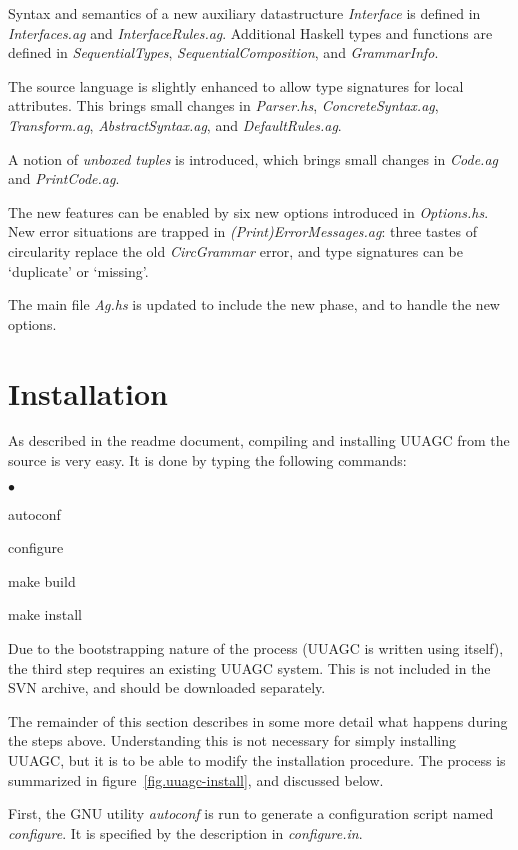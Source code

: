 \documentclass[twoside]{article}
\newenvironment{itize}{\begin{list}{$\bullet$}{\parsep=0pt\parskip=0pt\topsep=0pt\itemsep=0pt}}{\end{list}}
\begin{document}
Syntax and semantics of a new auxiliary datastructure {\em Interface} is defined
in {\em Interfaces.ag} and {\em InterfaceRules.ag}.
Additional Haskell types and functions are defined in
{\em SequentialTypes}, {\em SequentialComposition}, and {\em GrammarInfo}.

The source language is slightly enhanced to allow type signatures for local attributes.
This brings small changes in 
{\em Parser.hs},
{\em ConcreteSyntax.ag},
{\em Transform.ag},
{\em AbstractSyntax.ag},
and {\em DefaultRules.ag}.

A notion of {\em unboxed tuples} is introduced,
which brings small changes in
{\em Code.ag} and {\em PrintCode.ag}.

The new features can be enabled by six new options introduced in {\em Options.hs}.
New error situations are trapped in {\em (Print)ErrorMessages.ag}: three tastes of
circularity replace the old {\em CircGrammar} error, and type signatures can
be `duplicate' or `missing'.

The main file {\em Ag.hs} is updated to include the new phase, and to handle the new options.


\newpage
\section{Installation}

As described in the readme document, compiling and installing UUAGC from the source
is very easy. It is done by typing the following commands:
\begin{itize}
\item autoconf
\item configure
\item make build
\item make install
\end{itize}
Due to the bootstrapping nature of the process
(UUAGC is written using itself), the third step requires an existing UUAGC system.
This is not included in the SVN archive, and should be downloaded separately.

The remainder of this section describes in some more detail what happens during
the steps above. 
Understanding this is not necessary for simply installing UUAGC,
but it is to be able to modify the installation procedure.
The process is summarized in figure~\ref{fig.uuagc-install}, and discussed below.

First, the GNU utility {\em autoconf} is run to generate a configuration script
named {\em configure}. It is specified by the description in {\em configure.in}.
\end{document}
